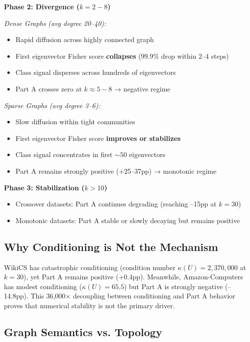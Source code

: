 \documentclass[11pt]{article}
\begin{document}
\textbf{Phase 2: Divergence ($k{=}2{-}8$)}

\emph{Dense Graphs (avg degree 20--40):}
\begin{itemize}
\item Rapid diffusion across highly connected graph
\item First eigenvector Fisher score \textbf{collapses} (99.9\% drop within 2--4 steps)
\item Class signal disperses across hundreds of eigenvectors
\item Part A crosses zero at $k{\approx}5{-}8$ → negative regime
\end{itemize}

\emph{Sparse Graphs (avg degree 3--6):}
\begin{itemize}
\item Slow diffusion within tight communities
\item First eigenvector Fisher score \textbf{improves or stabilizes}
\item Class signal concentrates in first ${\sim}50$ eigenvectors
\item Part A remains strongly positive (+25--37pp) → monotonic regime
\end{itemize}

\textbf{Phase 3: Stabilization ($k{>}10$)}
\begin{itemize}
\item Crossover datasets: Part A continues degrading (reaching --15pp at $k{=}30$)
\item Monotonic datasets: Part A stable or slowly decaying but remains positive
\end{itemize}

\subsection{Why Conditioning is Not the Mechanism}

WikiCS has catastrophic conditioning (condition number $\kappa(U) = 2{,}370{,}000$ at $k{=}30$), yet Part A remains positive (+0.4pp). Meanwhile, Amazon-Computers has modest conditioning ($\kappa(U) = 65.5$) but Part A is strongly negative (--14.8pp). This 36,000$\times$ decoupling between conditioning and Part A behavior proves that numerical stability is not the primary driver.

\subsection{Graph Semantics vs. Topology}
\end{document}
